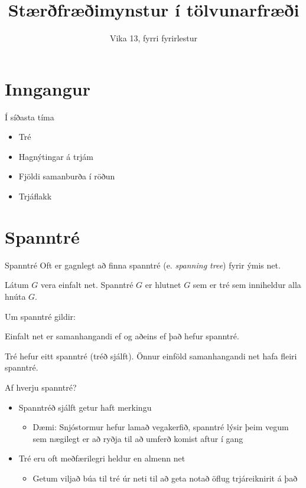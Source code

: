\documentclass[handout]{beamer}
\title{Stærðfræðimynstur í tölvunarfræði}
\subtitle{Vika 13, fyrri fyrirlestur}
\begin{document}
\begin{frame}
\titlepage
\end{frame}


\section{Inngangur}

\begin{frame}{Í síðasta tíma}
\begin{itemize}
 \item Tré
 \item Hagnýtingar á trjám
 \item Fjöldi samanburða í röðun
 \item Trjáflakk
\end{itemize}
\end{frame}

\section{Spanntré}

\begin{frame}{Spanntré}
Oft er gagnlegt að finna spanntré (e. \emph{spanning tree}) fyrir ýmis net.
\begin{tcolorbox}[title=Spanntré]
Látum $G$ vera einfalt net. Spanntré $G$ er hlutnet $G$ sem er tré sem inniheldur alla hnúta $G$.
\end{tcolorbox}
Um spanntré gildir:
\begin{tcolorbox}
Einfalt net er samanhangandi ef og aðeins ef það hefur spanntré.
\end{tcolorbox}
Tré hefur eitt spanntré (tréð sjálft). Önnur einföld samanhangandi net hafa fleiri spanntré.
\end{frame}

\begin{frame}{Af hverju spanntré?}
\begin{itemize}
 \item Spanntréð sjálft getur haft merkingu
 \begin{itemize}
  \item Dæmi: Snjóstormur hefur lamað vegakerfið, spanntré lýsir þeim vegum sem nægilegt er að ryðja til að umferð komist aftur í gang
 \end{itemize}
 \item Tré eru oft meðfærilegri heldur en almenn net
 \begin{itemize}
  \item Getum viljað búa til tré úr neti til að geta notað öflug trjáreiknirit á það
 \end{itemize}
\end{itemize}
\end{frame}
\end{document}
